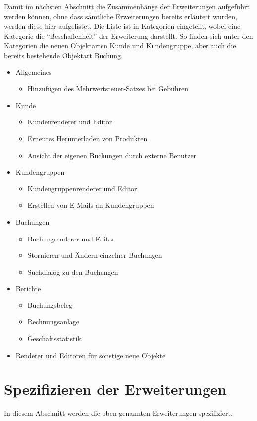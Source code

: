Damit im nächsten Abschnitt die Zusammenhänge der Erweiterungen aufgeführt werden können, ohne dass sämtliche Erweiterungen bereits erläutert wurden, werden diese hier aufgelistet.
Die Liste ist in Kategorien eingeteilt, wobei eine Kategorie die "`Beschaffenheit"' der Erweiterung darstellt. So finden sich unter den Kategorien die neuen Objektarten Kunde und Kundengruppe, aber auch die bereits bestehende Objektart Buchung. 
\begin{itemize}
	\item Allgemeines
	\begin{itemize}
		\item Hinzufügen des Mehrwertsteuer-Satzes bei Gebühren
	\end{itemize}
	\item Kunde
	\begin{itemize}
		\item Kundenrenderer und Editor
		\item Erneutes Herunterladen von Produkten
		\item Ansicht der eigenen Buchungen durch externe Benutzer
	\end{itemize}
	\item Kundengruppen
	\begin{itemize}
		\item Kundengruppenrenderer und Editor
		\item Erstellen von E-Mails an Kundengruppen
	\end{itemize}
	\item Buchungen
	\begin{itemize}
		\item Buchungrenderer und Editor
		\item Stornieren und Ändern einzelner Buchungen
		\item Suchdialog zu den Buchungen
	\end{itemize}
	\item Berichte
	\begin{itemize}
		\item Buchungsbeleg
		\item Rechnungsanlage
		\item Geschäftsstatistik
	\end{itemize}	 
	\item Renderer und Editoren für sonstige neue Objekte
\end{itemize}

\section{Spezifizieren der Erweiterungen}
In diesem Abschnitt werden die oben genannten Erweiterungen spezifiziert.  

